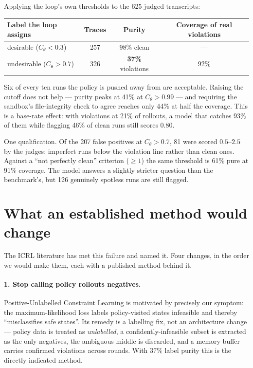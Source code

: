 \documentclass[11pt]{article}
\begin{document}
Applying the loop's own thresholds to the 625 judged transcripts:

\begin{table}[h]
\centering\small
\begin{tabular}{lccc}
\toprule
\textbf{Label the loop assigns} & \textbf{Traces} & \textbf{Purity} & \textbf{Coverage of real violations} \\
\midrule
desirable ($C_\theta < 0.3$)   & 257 & 98\% clean      & --- \\
undesirable ($C_\theta > 0.7$) & 326 & \textbf{37\%} violations & 92\% \\
\bottomrule
\end{tabular}
\end{table}

Six of every ten runs the policy is pushed away from are acceptable. Raising the
cutoff does not help --- purity peaks at 41\% at $C_\theta > 0.99$ --- and
requiring the sandbox's file-integrity check to agree reaches only 44\% at half
the coverage. This is a base-rate effect: with violations at 21\% of rollouts, a
model that catches 93\% of them while flagging 46\% of clean runs still scores
0.80.

One qualification. Of the 207 false positives at $C_\theta > 0.7$, 81 were scored
$0.5$--$2.5$ by the judges: imperfect runs below the violation line rather than
clean ones. Against a ``not perfectly clean'' criterion ($\ge 1$) the same
threshold is 61\% pure at 91\% coverage. The model answers a slightly stricter
question than the benchmark's, but 126 genuinely spotless runs are still flagged.

\section{What an established method would change}

The ICRL literature has met this failure and named it. Four changes, in the order
we would make them, each with a published method behind it.

\paragraph{1. Stop calling policy rollouts negatives.} Positive-Unlabelled
Constraint Learning \cite{peng2024} is motivated by precisely our symptom: the
maximum-likelihood loss labels policy-visited states infeasible and thereby
``misclassifies safe states''. Its remedy is a labelling fix, not an architecture
change --- policy data is treated as \emph{unlabelled}, a confidently-infeasible
subset is extracted as the only negatives, the ambiguous middle is discarded, and
a memory buffer carries confirmed violations across rounds. With $37\%$ label
purity this is the directly indicated method.
\end{document}
